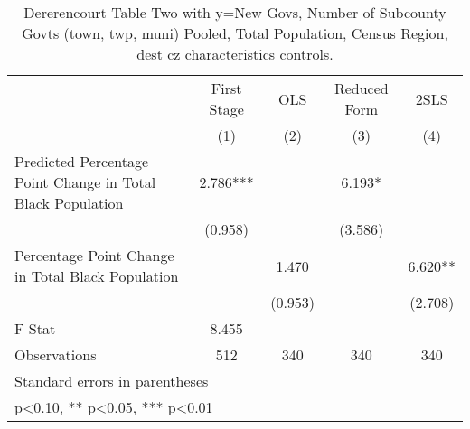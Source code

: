 \begin{table}[htbp]\centering
\def\sym#1{\ifmmode^{#1}\else\(^{#1}\)\fi}
\caption{Dererencourt Table Two with y=New Govs, Number of Subcounty Govts (town, twp, muni)  Pooled, Total Population, Census Region, dest cz characteristics controls.}
\begin{tabular}{l*{4}{c}}
\toprule
                    & First Stage   &         OLS   &Reduced Form   &        2SLS   \\
                    &\multicolumn{1}{c}{(1)}   &\multicolumn{1}{c}{(2)}   &\multicolumn{1}{c}{(3)}   &\multicolumn{1}{c}{(4)}   \\
\midrule
Predicted Percentage Point Change in Total Black Population&       2.786***&               &       6.193*  &               \\
                    &     (0.958)   &               &     (3.586)   &               \\
\addlinespace
Percentage Point Change in Total Black Population&               &       1.470   &               &       6.620** \\
                    &               &     (0.953)   &               &     (2.708)   \\
\midrule
F-Stat              &       8.455   &               &               &               \\
Observations        &         512   &         340   &         340   &         340   \\
\bottomrule
\multicolumn{5}{l}{\footnotesize Standard errors in parentheses}\\
\multicolumn{5}{l}{\footnotesize * p<0.10, ** p<0.05, *** p<0.01}\\
\end{tabular}
\end{table}
